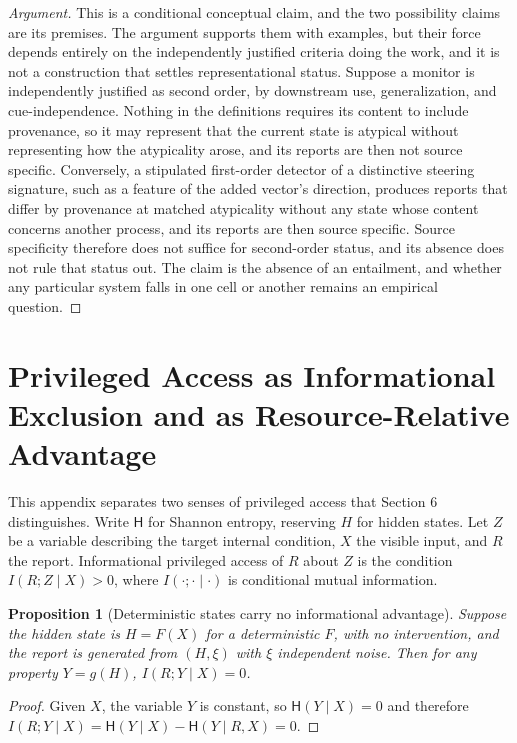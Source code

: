 \documentclass[11pt]{article}
\newtheorem{proposition}{Proposition}
\theoremstyle{definition}
\theoremstyle{remark}
\begin{document}
\begin{proof}[Argument]
This is a conditional conceptual claim, and the two possibility claims are its premises. The argument supports them with examples, but their force depends entirely on the independently justified criteria doing the work, and it is not a construction that settles representational status. Suppose a monitor is independently justified as second order, by downstream use, generalization, and cue-independence. Nothing in the definitions requires its content to include provenance, so it may represent that the current state is atypical without representing how the atypicality arose, and its reports are then not source specific. Conversely, a stipulated first-order detector of a distinctive steering signature, such as a feature of the added vector's direction, produces reports that differ by provenance at matched atypicality without any state whose content concerns another process, and its reports are then source specific. Source specificity therefore does not suffice for second-order status, and its absence does not rule that status out. The claim is the absence of an entailment, and whether any particular system falls in one cell or another remains an empirical question.
\end{proof}

\section{Privileged Access as Informational Exclusion and as Resource-Relative Advantage}\label{app:access}

This appendix separates two senses of privileged access that Section 6 distinguishes. Write $\mathsf{H}$ for Shannon entropy, reserving $H$ for hidden states. Let $Z$ be a variable describing the target internal condition, $X$ the visible input, and $R$ the report. Informational privileged access of $R$ about $Z$ is the condition $I(R;Z\mid X)>0$, where $I(\cdot;\cdot\mid\cdot)$ is conditional mutual information.

\begin{proposition}[Deterministic states carry no informational advantage]\label{prop:det}
Suppose the hidden state is $H=F(X)$ for a deterministic $F$, with no intervention, and the report is generated from $(H,\xi)$ with $\xi$ independent noise. Then for any property $Y=g(H)$, $I(R;Y\mid X)=0$.
\end{proposition}

\begin{proof}
Given $X$, the variable $Y$ is constant, so $\mathsf{H}(Y\mid X)=0$ and therefore $I(R;Y\mid X)=\mathsf{H}(Y\mid X)-\mathsf{H}(Y\mid R,X)=0$.
\end{proof}
\end{document}
